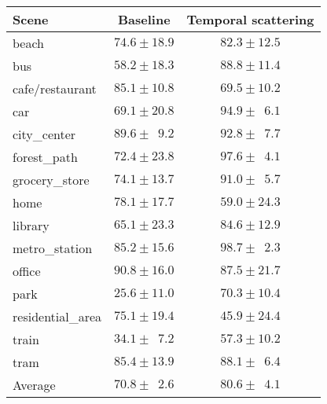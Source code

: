 \begin{tabular}{lcc}
\toprule
Scene & Baseline & Temporal scattering \\
\midrule
beach & $74.6 \pm 18.9$ & $82.3 \pm 12.5$ \\
bus & $58.2 \pm 18.3$ & $88.8 \pm 11.4$ \\
cafe/restaurant & $85.1 \pm 10.8$ & $69.5 \pm 10.2$ \\
car & $69.1 \pm 20.8$ & $94.9 \pm \phantom{0}6.1$ \\
city\_center & $89.6 \pm \phantom{0}9.2$ & $92.8 \pm \phantom{0}7.7$ \\
forest\_path & $72.4 \pm 23.8$ & $97.6 \pm \phantom{0}4.1$ \\
grocery\_store & $74.1 \pm 13.7$ & $91.0 \pm \phantom{0}5.7$ \\
home & $78.1 \pm 17.7$ & $59.0 \pm 24.3$ \\
library & $65.1 \pm 23.3$ & $84.6 \pm 12.9$ \\
metro\_station & $85.2 \pm 15.6$ & $98.7 \pm \phantom{0}2.3$ \\
office & $90.8 \pm 16.0$ & $87.5 \pm 21.7$ \\
park & $25.6 \pm 11.0$ & $70.3 \pm 10.4$ \\
residential\_area & $75.1 \pm 19.4$ & $45.9 \pm 24.4$ \\
train & $34.1 \pm \phantom{0}7.2$ & $57.3 \pm 10.2$ \\
tram & $85.4 \pm 13.9$ & $88.1 \pm \phantom{0}6.4$ \\
\bottomrule
Average & $70.8 \pm \phantom{0}2.6$ & $80.6 \pm \phantom{0}4.1$ \\
\end{tabular}
